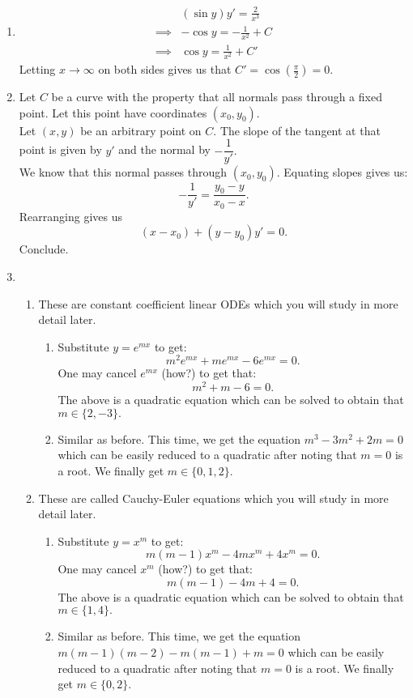 \documentclass[12pt]{article}
\theoremstyle{definition}
\numberwithin{thm}{section}
\begin{document}
\begin{enumerate}[leftmargin=*, label = Q.\arabic*.]
	\item 
	\begin{align*} 
		& (\sin y)y' = \frac{2}{x^3}\\
		\implies & -\cos y = -\frac{1}{x^2} + C\\
		\implies & \cos y = \frac{1}{x^2} + C'
	\end{align*}
	Letting $x \to \infty$ on both sides gives us that $C' = \cos\left(\frac{\pi}{2}\right) = 0.$
	\item Let $C$ be a curve with the property that all normals pass through a fixed point. Let this point have coordinates $(x_0, y_0).$\\
	Let $(x, y)$ be an arbitrary point on $C.$ The slope of the tangent at that point is given by $y'$ and the normal by $-\dfrac{1}{y'}.$\\
	We know that this normal passes through $(x_0, y_0).$ Equating slopes gives us:
	\[-\dfrac{1}{y'} = \dfrac{y_0 - y}{x_0 - x}.\]
	Rearranging gives us
	\[(x - x_0) + (y - y_0)y' = 0.\]
	Conclude.
	\item 
	\begin{enumerate}[label = (\alph*)] 
		\item These are constant coefficient linear ODEs which you will study in more detail later.
		\begin{enumerate}[label = (\roman*)] 
			\item Substitute $y = e^{mx}$ to get:
			\[m^2e^{mx} + me^{mx} - 6e^{mx} = 0.\]
			One may cancel $e^{mx}$ (how?) to get that:
			\[m^2 + m - 6 = 0.\]
			The above is a quadratic equation which can be solved to obtain that $m \in \{2, -3\}.$
			\item Similar as before. This time, we get the equation $m^3 - 3m^2 + 2m = 0$ which can be easily reduced to a quadratic after noting that $m = 0$ is a root. We finally get $m \in \{0, 1, 2\}.$
		\end{enumerate}	
		\item These are called Cauchy-Euler equations which you will study in more detail later.
		\begin{enumerate}[label = (\roman*)] 
			\item Substitute $y = x^m$ to get:
			\[m(m - 1)x^{m} - 4mx^{m} + 4x^{m} = 0.\]
			One may cancel $x^m$ (how?) to get that:
			\[m(m - 1) - 4m + 4 = 0.\]
			The above is a quadratic equation which can be solved to obtain that $m \in \{1, 4\}.$
			\item Similar as before. This time, we get the equation $m(m - 1)(m - 2) - m(m - 1) + m = 0$ which can be easily reduced to a quadratic after noting that $m = 0$ is a root. We finally get $m \in \{0, 2\}.$ \\

\end{enumerate}
\end{enumerate}
\end{enumerate}
\end{document}
